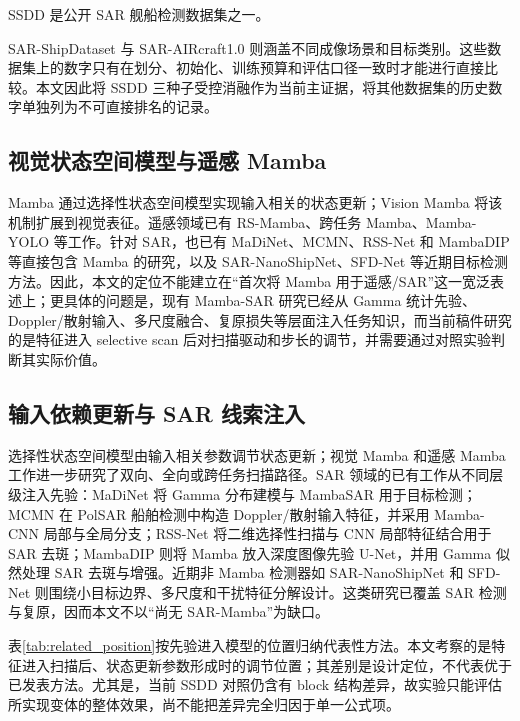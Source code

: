 \documentclass[UTF8,12pt,a4paper]{ctexart}
\begin{document}
SSDD 是公开 SAR 舰船检测数据集之一\cite{ssdd2017,ssdd2021}。

SAR-ShipDataset 与 SAR-AIRcraft1.0 则涵盖不同成像场景和目标类别\cite{sardataset,saraircraft}。这些数据集上的数字只有在划分、初始化、训练预算和评估口径一致时才能进行直接比较。本文因此将 SSDD 三种子受控消融作为当前主证据，将其他数据集的历史数字单独列为不可直接排名的记录。

\subsection{视觉状态空间模型与遥感 Mamba}
Mamba 通过选择性状态空间模型实现输入相关的状态更新\cite{gu2023mamba}；Vision Mamba 将该机制扩展到视觉表征\cite{liu2024visionmamba}。遥感领域已有 RS-Mamba、跨任务 Mamba、Mamba-YOLO 等工作\cite{rs_mamba,rstmtmamba,mambayolo}。针对 SAR，也已有 MaDiNet、MCMN、RSS-Net 和 MambaDIP 等直接包含 Mamba 的研究，以及 SAR-NanoShipNet、SFD-Net 等近期目标检测方法\cite{madinet,mcmn,rssnet,mambadip,sarnano,sfdnet}。因此，本文的定位不能建立在“首次将 Mamba 用于遥感/SAR”这一宽泛表述上；更具体的问题是，现有 Mamba-SAR 研究已经从 Gamma 统计先验、Doppler/散射输入、多尺度融合、复原损失等层面注入任务知识，而当前稿件研究的是特征进入 selective scan 后对扫描驱动和步长的调节，并需要通过对照实验判断其实际价值。

\subsection{输入依赖更新与 SAR 线索注入}
选择性状态空间模型由输入相关参数调节状态更新；视觉 Mamba 和遥感 Mamba 工作进一步研究了双向、全向或跨任务扫描路径\cite{gu2023mamba,liu2024visionmamba,rs_mamba,rstmtmamba}。SAR 领域的已有工作从不同层级注入先验：MaDiNet 将 Gamma 分布建模与 MambaSAR 用于目标检测；MCMN 在 PolSAR 船舶检测中构造 Doppler/散射输入特征，并采用 Mamba-CNN 局部与全局分支；RSS-Net 将二维选择性扫描与 CNN 局部特征结合用于 SAR 去斑；MambaDIP 则将 Mamba 放入深度图像先验 U-Net，并用 Gamma 似然处理 SAR 去斑与增强\cite{madinet,mcmn,rssnet,mambadip}。近期非 Mamba 检测器如 SAR-NanoShipNet 和 SFD-Net 则围绕小目标边界、多尺度和干扰特征分解设计\cite{sarnano,sfdnet}。这类研究已覆盖 SAR 检测与复原，因而本文不以“尚无 SAR-Mamba”为缺口。

表\ref{tab:related_position}按先验进入模型的位置归纳代表性方法。本文考察的是特征进入扫描后、状态更新参数形成时的调节位置；其差别是设计定位，不代表优于已发表方法。尤其是，当前 SSDD 对照仍含有 block 结构差异，故实验只能评估所实现变体的整体效果，尚不能把差异完全归因于单一公式项。
\end{document}
